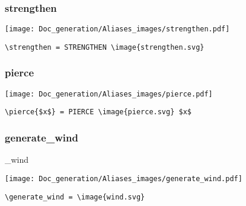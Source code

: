 \documentclass{article}
\begin{document}
\subsubsection{strengthen}
\begin{minipage}{0.45\linewidth}
\raggedright
\begin{spverbatim}
\strengthen 
\end{spverbatim}
\end{minipage}
\begin{minipage}{0.45\linewidth}
\raggedleft
\texttt{[image: Doc\_generation/Aliases\_images/strengthen.pdf]}
\end{minipage}
\begin{center}
\begin{BVerbatim}
\strengthen = STRENGTHEN \image{strengthen.svg}
\end{BVerbatim}
\end{center}

\subsubsection{pierce}
\begin{minipage}{0.45\linewidth}
\raggedright
\begin{spverbatim}
\end{spverbatim}
\end{minipage}
\begin{minipage}{0.45\linewidth}
\raggedleft
\texttt{[image: Doc\_generation/Aliases\_images/pierce.pdf]}
\end{minipage}
\begin{center}
\begin{BVerbatim}
\pierce{$x$} = PIERCE \image{pierce.svg} $x$
\end{BVerbatim}
\end{center}

\subsubsection{generate\_wind}
\begin{minipage}{0.45\linewidth}
\raggedright
\begin{spverbatim}
\generate_wind 
\end{spverbatim}
\end{minipage}
\begin{minipage}{0.45\linewidth}
\raggedleft
\texttt{[image: Doc\_generation/Aliases\_images/generate\_wind.pdf]}
\end{minipage}
\begin{center}
\begin{BVerbatim}
\generate_wind = \image{wind.svg}
\end{BVerbatim}
\end{center}
\end{document}

